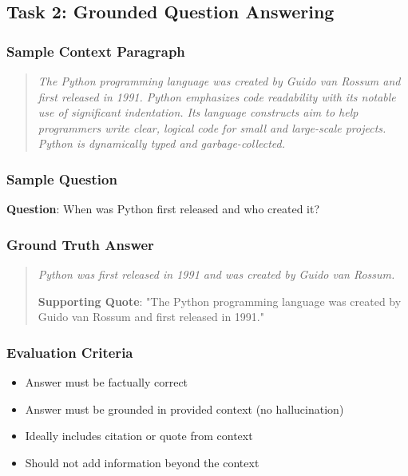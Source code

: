 \documentclass[11pt,a4paper]{article}
\begin{document}
\subsection{Task 2: Grounded Question Answering}

\subsubsection{Sample Context Paragraph}

\begin{quote}
\textit{The Python programming language was created by Guido van Rossum and first released in 1991. Python emphasizes code readability with its notable use of significant indentation. Its language constructs aim to help programmers write clear, logical code for small and large-scale projects. Python is dynamically typed and garbage-collected.}
\end{quote}

\subsubsection{Sample Question}

\textbf{Question}: When was Python first released and who created it?

\subsubsection{Ground Truth Answer}

\begin{quote}
\textit{Python was first released in 1991 and was created by Guido van Rossum.}

\textbf{Supporting Quote}: "The Python programming language was created by Guido van Rossum and first released in 1991."
\end{quote}

\subsubsection{Evaluation Criteria}

\begin{itemize}[leftmargin=*]
    \item Answer must be factually correct
    \item Answer must be grounded in provided context (no hallucination)
    \item Ideally includes citation or quote from context
    \item Should not add information beyond the context
\end{itemize}
\end{document}
